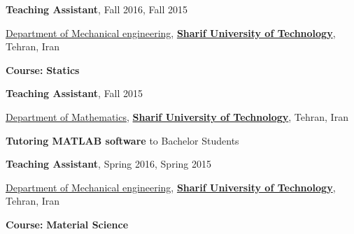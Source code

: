 \documentclass[8pt]{article}
\newcommand{\halfblankline}{\quad\vspace{-0.5\baselineskip}\pagebreak[3]}
\begin{document}
\begin{comment}
\textbf{Teaching Assistant}, {October 2020}
\begin{innerlist}
	\item[] \href{https://www.mech.kuleuven.be/en}{Department of Mechanical engineering}, \href{https://www.kuleuven.be/english/kuleuven}{\textbf{KU Leuven}}, Leuven, Belgium
	\begin{innerlist}
		\item[] \textbf{Course:} \href{https://onderwijsaanbod.kuleuven.be//syllabi/e/H06X2AE.htm#activetab=doelstellingen_idp596880} {\textbf{Advanced Study Topics in Musculoskeletal Biomechanics}}
		
	\end{innerlist}
\end{innerlist}

\halfblankline
\end{comment}

\textbf{Teaching Assistant}, {Fall 2016, Fall 2015}
\begin{innerlist}
	\item[] \href{http://library.sharif.ir/web/mech/20}{Department of Mechanical engineering}, \href{https://en.sharif.edu/}{\textbf{Sharif University of Technology}}, Tehran, Iran
	\begin{innerlist}
		\item[] \textbf{Course:}  {\textbf{Statics}}
		
	\end{innerlist}
\end{innerlist}

\halfblankline

\textbf{Teaching Assistant}, {Fall 2015}
\begin{innerlist}
	\item[] \href{http://math.sharif.ir/}{Department of Mathematics}, \href{https://en.sharif.edu/}{\textbf{Sharif University of Technology}}, Tehran, Iran
	\begin{innerlist}
		\item[] \textbf{Tutoring MATLAB software} to Bachelor Students
		
	\end{innerlist}
\end{innerlist}

\halfblankline

\textbf{Teaching Assistant}, {Spring 2016, Spring 2015}
\begin{innerlist}
	\item[] \href{http://library.sharif.ir/web/mech/20}{Department of Mechanical engineering}, \href{https://en.sharif.edu/}{\textbf{Sharif University of Technology}}, Tehran, Iran
	\begin{innerlist}
		\item[] \textbf{Course:}  {\textbf{Material Science}}
		
	\end{innerlist}
\end{innerlist}
\end{document}

